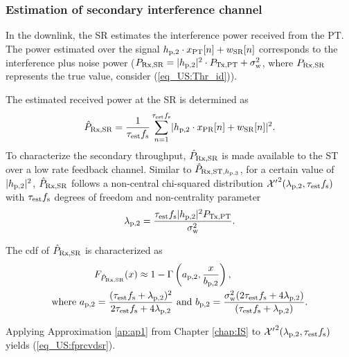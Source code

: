 \subsubsection{Estimation of secondary interference channel}
In the downlink, the SR estimates the interference power received from the PT. The power estimated over the signal $h_{\text{p,2}} \cdot x_{\text{PT}}[n] + w_{\text{SR}}[n]$ corresponds to the interference plus noise power ($P_{\text{Rx,SR}} = |h_{\text{p,2}}|^2 \cdot P_{\text{Tx,PT}} + \sigma^2_{\text{w}}$, where $P_{\text{Rx,SR}}$ represents the true value, consider (\ref{eq_US:Thr_id})). 

The estimated received power at the SR is determined as 
\begin{align}
\hat{P}_{\text{Rx,SR}} = {\frac{1}{{\tau_{\text{est}} f_{\text{s}}}}\sum_{n=1}^{\tau_{\text{est}} f_{\text{s}}}} {|h_{\text{p,2}} \cdot x_{\text{PR}}[n] + w_{\text{SR}}[n]|^2}. 
\label{eq_US:eprcvdsr}
\end{align}
To characterize the secondary throughput, $\hat{P}_{\text{Rx,SR}}$ is made available to the ST over a low rate feedback channel. Similar to $\hat{P}_{\text{Rx,ST,$h_{\text{p,3}}$}}$, for a certain value of $|h_{\text{p,2}}|^2$, $\hat{P}_{\text{Rx,SR}}$ follows a non-central chi-squared distribution $\ncchi2(\lpt, \test \fsam)$ with $\tau_{\text{est}} f_{\text{s}}$ degrees of freedom and non-centrality parameter \begin{align}
\lambda_{\text{p,2}} = \frac{\tau_{\text{est}} f_{\text{s}} |h_{\text{p,2}}|^2 P_{\text{Tx,PT}}}{\sigma^2_{\text{w}}}.
\label{eq_US:ncp_lpt}
\end{align}
\begin{lemma} \label{lm_US:lm3}
\normalfont
The cdf of $\hat{P}_{\text{Rx,SR}}$ is characterized as 
\begin{align}
F_{\hat{P}_{\text{Rx,SR}}}(x) \approx 1 - \Gamma&\left(a_{\text{p,2}}, \frac{x}{b_{\text{p,2}}}\right) \label{eq_US:fprcvdsr}, \\ 
\text{where  } a_{\text{p,2}} = \frac{(\tau_{\text{est}} f_{\text{s}} + \lambda_{\text{p,2}})^2}{2 \tau_{\text{est}} f_{\text{s}} + 4 \lambda_{\text{p,2}}} &\text{ and } b_{\text{p,2}} = \frac{\sigma^2_{\text{w}} (2 \tau_{\text{est}} f_{\text{s}} + 4 \lambda_{\text{p,2}})}{(\tau_{\text{est}} f_{\text{s}} + \lambda_{\text{p,2}})}.  \label{eq_US:para_pt} 
\end{align} 
\end{lemma}
\begin{IEEEproof}[Solution]
Applying Approximation \ref{ap:ap1} from Chapter \ref{chap:IS} to $\ncchi2(\lpt, \test \fsam)$ yields (\ref{eq_US:fprcvdsr}). 
\end{IEEEproof}
{}

